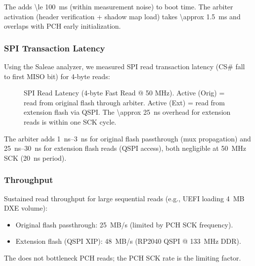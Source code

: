 The \vbfc adds \SI{\le 100}{ms} (within measurement noise) to boot time. The arbiter activation (header verification + shadow map load) takes \SI{\approx 1.5}{ms} and overlaps with \ac{PCH} early initialization.

\subsubsection{SPI Transaction Latency}
Using the Saleae analyzer, we measured \ac{SPI} read transaction latency (CS\# fall to first MISO bit) for 4-byte reads:

\begin{figure}[h]
\centering
{}
\caption{SPI Read Latency (4-byte Fast Read @ 50 MHz). Active (Orig) = read from original flash through arbiter. Active (Ext) = read from extension flash via QSPI. The \SI{\approx 25}{ns} overhead for extension reads is within one SCK cycle.}
\label{fig:spi_latency}
\end{figure}

The arbiter adds \SIrange{1}{3}{ns} for original flash passthrough (mux propagation) and \SIrange{25}{30}{ns} for extension flash reads (QSPI access), both negligible at \SI{50}{MHz} SCK (\SI{20}{ns} period).

\subsubsection{Throughput}
Sustained read throughput for large sequential reads (e.g., \ac{UEFI} loading \SI{4}{MB} DXE volume):
\begin{itemize}
    \item Original flash passthrough: \SI{25}{MB/s} (limited by \ac{PCH} SCK frequency).
    \item Extension flash (QSPI XIP): \SI{48}{MB/s} (RP2040 QSPI @ \SI{133}{MHz} DDR).
\end{itemize}
The \vbfc does not bottleneck \ac{PCH} reads; the \ac{PCH} SCK rate is the limiting factor.

